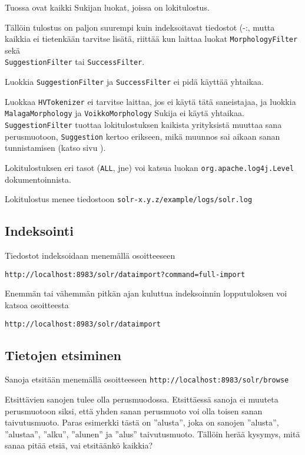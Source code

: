 \documentclass[12pt,a4paper]{scrartcl}
\begin{document}
Tuossa ovat kaikki Sukijan luokat, joissa on lokitulostus.

Tällöin tulostus on paljon suurempi kuin indeksoitavat tiedostot (-:,
mutta kaikkia ei tietenkään tarvitse lisätä, riittää kun laittaa
luokat \verb=MorphologyFilter= sekä \\
\verb=SuggestionFilter= tai \verb=SuccessFilter=.

Luokkia \verb=SuggestionFilter= ja \verb=SuccessFilter= ei pidä
käyttää yhtaikaa.

Luokkaa \verb=HVTokenizer= ei tarvitse laittaa, jos ei käytä tätä
saneistajaa, ja luokkia \\
\verb=MalagaMorphology= ja \verb=VoikkoMorphology= Sukija ei käytä
yhtaikaa. \verb=SuggestionFilter= tuottaa lokitulostuksen kaikista
yrityksistä muuttaa sana perusmuotoon, \verb=Suggestion= kertoo
erikseen, mikä muunnos sai aikaan sanan tunnistamisen (katso sivu
).

Lokitulostuksen eri tasot (\verb=ALL=, jne) voi katsua luokan
\verb=org.apache.log4j.Level= dokumentoinnista.

Lokitulostus menee tiedostoon \verb=solr-x.y.z/example/logs/solr.log=


\subsection*{Indeksointi}

Tiedostot indeksoidaan menemällä osoitteeseen

\verb|http://localhost:8983/solr/dataimport?command=full-import|

Enemmän tai vähemmän pitkän ajan kuluttua indeksoinnin lopputuloksen
voi katsoa osoitteesta

\verb|http://localhost:8983/solr/dataimport|


\subsection*{Tietojen etsiminen}

Sanoja etsitään menemällä osoitteeseen
\verb=http://localhost:8983/solr/browse=

Etsittävien sanojen tulee olla perusmuodossa. Etsittäessä sanoja ei
muuteta perusmuotoon siksi, että yhden sanan perusmuoto voi olla
toisen sanan taivutusmuoto. Paras esimerkki tästä on ''alusta'', joka
on sanojen ''alusta'', ''alustaa'', ''alku'', ''alunen'' ja ''alus''
taivutusmuoto. Tällöin herää kysymys, mitä sanaa pitää etsiä, vai
etsitäänkö kaikkia?
\end{document}
